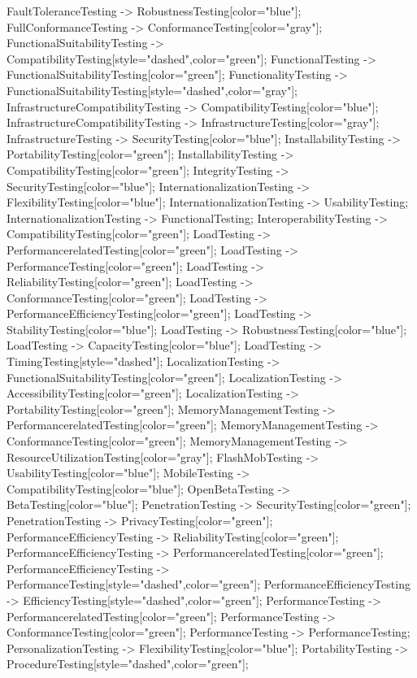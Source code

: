 \documentclass{article}
\begin{document}
{FaultToleranceTesting -> RobustnessTesting[color="blue"];
FullConformanceTesting -> ConformanceTesting[color="gray"];
FunctionalSuitabilityTesting -> CompatibilityTesting[style="dashed",color="green"];
FunctionalTesting -> FunctionalSuitabilityTesting[color="green"];
FunctionalityTesting -> FunctionalSuitabilityTesting[style="dashed",color="gray"];
InfrastructureCompatibilityTesting -> CompatibilityTesting[color="blue"];
InfrastructureCompatibilityTesting -> InfrastructureTesting[color="gray"];
InfrastructureTesting -> SecurityTesting[color="blue"];
InstallabilityTesting -> PortabilityTesting[color="green"];
InstallabilityTesting -> CompatibilityTesting[color="green"];
IntegrityTesting -> SecurityTesting[color="blue"];
InternationalizationTesting -> FlexibilityTesting[color="blue"];
InternationalizationTesting -> UsabilityTesting;
InternationalizationTesting -> FunctionalTesting;
InteroperabilityTesting -> CompatibilityTesting[color="green"];
LoadTesting -> PerformancerelatedTesting[color="green"];
LoadTesting -> PerformanceTesting[color="green"];
LoadTesting -> ReliabilityTesting[color="green"];
LoadTesting -> ConformanceTesting[color="green"];
LoadTesting -> PerformanceEfficiencyTesting[color="green"];
LoadTesting -> StabilityTesting[color="blue"];
LoadTesting -> RobustnessTesting[color="blue"];
LoadTesting -> CapacityTesting[color="blue"];
LoadTesting -> TimingTesting[style="dashed"];
LocalizationTesting -> FunctionalSuitabilityTesting[color="green"];
LocalizationTesting -> AccessibilityTesting[color="green"];
LocalizationTesting -> PortabilityTesting[color="green"];
MemoryManagementTesting -> PerformancerelatedTesting[color="green"];
MemoryManagementTesting -> ConformanceTesting[color="green"];
MemoryManagementTesting -> ResourceUtilizationTesting[color="gray"];
FlashMobTesting -> UsabilityTesting[color="blue"];
MobileTesting -> CompatibilityTesting[color="blue"];
OpenBetaTesting -> BetaTesting[color="blue"];
PenetrationTesting -> SecurityTesting[color="green"];
PenetrationTesting -> PrivacyTesting[color="green"];
PerformanceEfficiencyTesting -> ReliabilityTesting[color="green"];
PerformanceEfficiencyTesting -> PerformancerelatedTesting[color="green"];
PerformanceEfficiencyTesting -> PerformanceTesting[style="dashed",color="green"];
PerformanceEfficiencyTesting -> EfficiencyTesting[style="dashed",color="green"];
PerformanceTesting -> PerformancerelatedTesting[color="green"];
PerformanceTesting -> ConformanceTesting[color="green"];
PerformanceTesting -> PerformanceTesting;
PersonalizationTesting -> FlexibilityTesting[color="blue"];
PortabilityTesting -> ProcedureTesting[style="dashed",color="green"];
}
\end{document}
